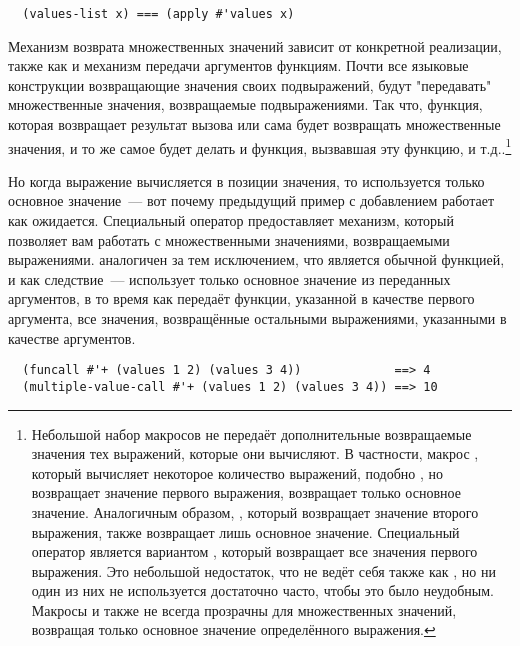 \begin{verbatim}
  (values-list x) === (apply #'values x)
\end{verbatim}

Механизм возврата множественных значений зависит от конкретной реализации, также как и
механизм передачи аргументов функциям.  Почти все языковые конструкции возвращающие
значения своих подвыражений, будут "передавать" множественные значения, возвращаемые
подвыражениями.  Так что, функция, которая возвращает результат вызова  или
 сама будет возвращать множественные значения, и то же самое будет
делать и функция, вызвавшая эту функцию, и т.д..\footnote{Небольшой набор макросов не
  передаёт дополнительные возвращаемые значения тех выражений, которые они вычисляют.  В
  частности, макрос , который вычисляет некоторое количество выражений,
  подобно , но возвращает значение первого выражения, возвращает только
  основное значение.  Аналогичным образом, , который возвращает значение
  второго выражения, также возвращает лишь основное значение.  Специальный оператор
   является вариантом , который возвращает все
  значения первого выражения.  Это небольшой недостаток, что  не ведёт себя
  также как , но ни один из них не используется достаточно
  часто, чтобы это было неудобным.  Макросы  и  также не всегда
  прозрачны для множественных значений, возвращая только основное значение определённого
  выражения.}

Но когда выражение вычисляется в позиции значения, то используется только основное
значение~--- вот почему предыдущий пример с добавлением работает как ожидается. Специальный
оператор  предоставляет механизм, который позволяет вам работать
с множественными значениями, возвращаемыми выражениями. 
аналогичен  за тем исключением, что  является обычной
функцией, и как следствие~--- использует только основное значение из переданных аргументов,
в то время как  передаёт функции, указанной в качестве первого
аргумента, все значения, возвращённые остальными выражениями, указанными в качестве
аргументов.

\begin{verbatim}
  (funcall #'+ (values 1 2) (values 3 4))             ==> 4
  (multiple-value-call #'+ (values 1 2) (values 3 4)) ==> 10
\end{verbatim}

